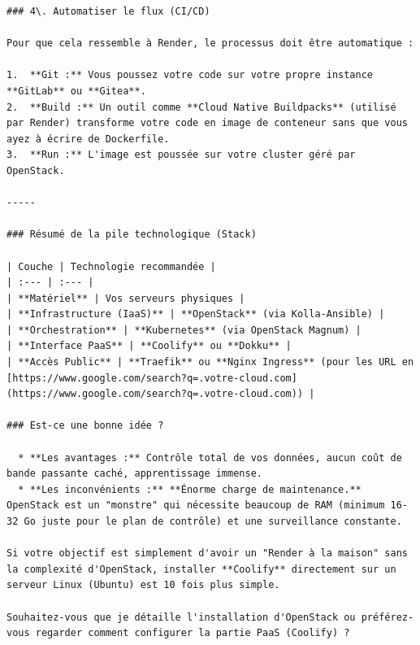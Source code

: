 \documentclass{report} %
\begin{document}
\begin{verbatim}
### 4\. Automatiser le flux (CI/CD)

Pour que cela ressemble à Render, le processus doit être automatique :

1.  **Git :** Vous poussez votre code sur votre propre instance **GitLab** ou **Gitea**.
2.  **Build :** Un outil comme **Cloud Native Buildpacks** (utilisé par Render) transforme votre code en image de conteneur sans que vous ayez à écrire de Dockerfile.
3.  **Run :** L'image est poussée sur votre cluster géré par OpenStack.

-----

### Résumé de la pile technologique (Stack)

| Couche | Technologie recommandée |
| :--- | :--- |
| **Matériel** | Vos serveurs physiques |
| **Infrastructure (IaaS)** | **OpenStack** (via Kolla-Ansible) |
| **Orchestration** | **Kubernetes** (via OpenStack Magnum) |
| **Interface PaaS** | **Coolify** ou **Dokku** |
| **Accès Public** | **Traefik** ou **Nginx Ingress** (pour les URL en [https://www.google.com/search?q=.votre-cloud.com](https://www.google.com/search?q=.votre-cloud.com)) |

### Est-ce une bonne idée ?

  * **Les avantages :** Contrôle total de vos données, aucun coût de bande passante caché, apprentissage immense.
  * **Les inconvénients :** **Énorme charge de maintenance.** OpenStack est un "monstre" qui nécessite beaucoup de RAM (minimum 16-32 Go juste pour le plan de contrôle) et une surveillance constante.

Si votre objectif est simplement d'avoir un "Render à la maison" sans la complexité d'OpenStack, installer **Coolify** directement sur un serveur Linux (Ubuntu) est 10 fois plus simple.

Souhaitez-vous que je détaille l'installation d'OpenStack ou préférez-vous regarder comment configurer la partie PaaS (Coolify) ?
\end{verbatim}
\end{document}
